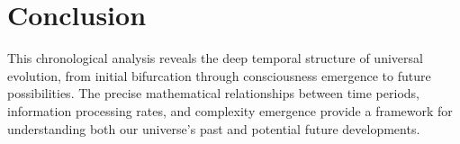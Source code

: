 \documentclass{article}
\begin{document}
\section{Conclusion}

This chronological analysis reveals the deep temporal structure of universal evolution, from initial bifurcation through consciousness emergence to future possibilities. The precise mathematical relationships between time periods, information processing rates, and complexity emergence provide a framework for understanding both our universe's past and potential future developments.
\end{document}
